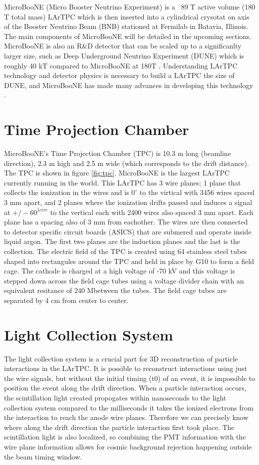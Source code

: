 MicroBooNE (Micro Booster Neutrino Experiment) is a ~89 T active volume (180 T total mass) LArTPC which is then inserted into a cylindrical crysotat on axis of the Booster Neutrino Beam (BNB) stationed at Fermilab in Batavia, Illinois. The main components of MicroBooNE will be detailed in the upcoming sections. MicroBooNE is also an R\&D detector that can be scaled up to a significanlty larger size, such as Deep Underground Neutrino Experiment (DUNE) which is roughly 40 kT compared to MicroBooNE at 180T \cite{dune}. Understanding LArTPC technology and detector physics is necessary to build a LArTPC the size of DUNE, and MicroBooNE has made many advances in developing this technology\cite{noisechar} \cite{michel}. 
\section{Time Projection Chamber}
MicroBooNE's Time Projection Chamber (TPC) is 10.3 m long (beamline direction), 2.3 m high and 2.5 m wide (which corresponds to the drift distance). The TPC is shown in figure \ref{fig:tpc}. MicroBooNE is the largest LArTPC currently running in the world\cite{microboone}. This LArTPC has 3 wire planes: 1 plane that collects the ionization in the wires and is $0^{\circ}$ to the virtical with 3456 wires spaced 3 mm apart, and 2 planes where the ionization drifts passed and induces a signal at $+/- 60^{\}circ}$ to the vertical each with 2400 wires also spaced 3 mm apart. Each plane has a spacing also of 3 mm from eachother. The wires are then connected to detector specific circuit boards (ASICS) that are submered and operate inside liquid argon. The first two planes are the induction planes and the last is the collection. The electric field of the TPC is created using 64 stainless steel tubes shaped into rectangules around the TPC and held in place by G10 to form a field cage. The cathode is charged at a high voltage of -70 kV and this voltage is stepped down across the field cage tubes using a voltage divider chain with an equivalent resitance of 240 M\ohm between the tubes. The field cage tubes are separated by 4 cm from center to center. 
\section{Light Collection System}
The light collection system is a crucial part for 3D reconstruction of particle interactions in the LArTPC. It is possible to reconstruct interactions using just the wire signals, but without the initial timing (t0) of an event, it is impossible to position the event along the drift direction. When a particle interaction occurs, the scintillation light created propogates within nanoseconds to the light collection system compared to the milliseconds it takes the ionized electrons from the interaction to reach the anode wire planes. Therefore we can precisely know where along the drift direction the particle interaction first took place. The scintillation light is also localized, so combining the PMT information with the wire plane information allows for cosmic background rejection happening outside the beam timing window.  

